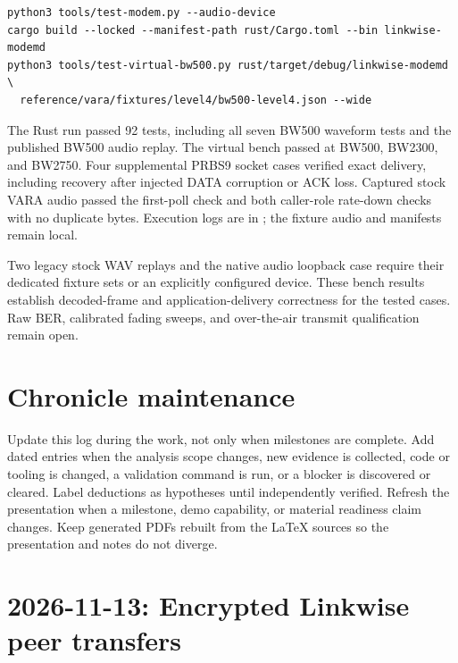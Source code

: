 \documentclass[11pt,a4paper]{article}
\newcommand{\pathtext}[1]{\path{#1}}
\begin{document}
\noindent\begin{minipage}{\linewidth}
\begin{lstlisting}
python3 tools/test-modem.py --audio-device
cargo build --locked --manifest-path rust/Cargo.toml --bin linkwise-modemd
python3 tools/test-virtual-bw500.py rust/target/debug/linkwise-modemd \
  reference/vara/fixtures/level4/bw500-level4.json --wide
\end{lstlisting}
\end{minipage}

The Rust run passed 92 tests, including all seven BW500 waveform tests
and the published BW500 audio replay. The virtual bench passed at BW500,
BW2300, and BW2750. Four supplemental PRBS9 socket cases verified exact
delivery, including recovery after injected DATA corruption or ACK loss.
Captured stock VARA audio passed the first-poll check and both caller-role
rate-down checks with no duplicate bytes. Execution logs are in
\pathtext{/tmp/linkwise-enhanced.VZSprv}; the fixture audio and manifests
remain local.

Two legacy stock WAV replays and the native audio loopback case require
their dedicated fixture sets or an explicitly configured device. These
bench results establish decoded-frame and application-delivery correctness
for the tested cases. Raw BER, calibrated fading sweeps, and over-the-air
transmit qualification remain open.

\section{Chronicle maintenance}

Update this log during the work, not only when milestones are complete. Add
dated entries when the analysis scope changes, new evidence is collected, code
or tooling is changed, a validation command is run, or a blocker is discovered
or cleared. Label deductions as hypotheses until independently verified.
Refresh the presentation when a milestone, demo capability, or material
readiness claim changes. Keep generated PDFs rebuilt from the \LaTeX{} sources
so the presentation and notes do not diverge.

\section{2026-11-13: Encrypted Linkwise peer transfers}
\label{sec:encrypted-transfer-2026-11-13}
\end{document}

